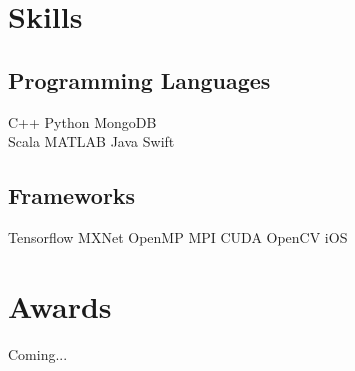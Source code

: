 \documentclass[]{deedy-resume-openfont}
\begin{document}
\begin{minipage}[t]{0.30\textwidth}
\sectionsep


\section{Skills}
\subsection{Programming Languages}
C++ \textbullet{} Python \textbullet{} MongoDB \\
Scala \textbullet{} MATLAB \textbullet{} Java \textbullet{} Swift\\

\sectionsep %

\subsection{Frameworks}
Tensorflow \textbullet{} MXNet \textbullet{} OpenMP \textbullet{} MPI \textbullet{} CUDA \textbullet{} OpenCV \textbullet{} iOS

\sectionsep


\section{Awards} 
Coming...
\sectionsep

%
%

\end{minipage} 
\hfill
\end{document}
